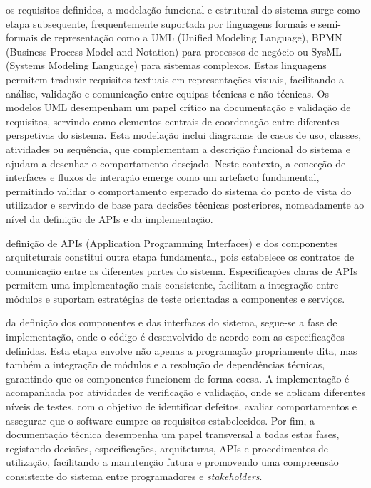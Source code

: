  os requisitos definidos, a modelação funcional e estrutural do sistema surge como etapa subsequente, frequentemente suportada por linguagens formais e semi-formais de representação como a UML (Unified Modeling Language), BPMN (Business Process Model and Notation) para processos de negócio ou SysML (Systems Modeling Language) para sistemas complexos. Estas linguagens permitem traduzir requisitos textuais em representações visuais, facilitando a análise, validação e comunicação entre equipas técnicas e não técnicas. Os modelos UML desempenham um papel crítico na documentação e validação de requisitos, servindo como elementos centrais de coordenação entre diferentes perspetivas do sistema\cite{UML}. Esta modelação inclui diagramas de casos de uso, classes, atividades ou sequência, que complementam a descrição funcional do sistema e ajudam a desenhar o comportamento desejado. Neste contexto, a conceção de interfaces e fluxos de interação emerge como um artefacto fundamental, permitindo validar o comportamento esperado do sistema do ponto de vista do utilizador e servindo de base para decisões técnicas posteriores, nomeadamente ao nível da definição de APIs e da implementação.\par

 definição de APIs (Application Programming Interfaces) e dos componentes arquiteturais constitui outra etapa fundamental, pois estabelece os contratos de comunicação entre as diferentes partes do sistema. Especificações claras de APIs permitem uma implementação mais consistente, facilitam a integração entre módulos e suportam estratégias de teste orientadas a componentes e serviços.

 da definição dos componentes e das interfaces do sistema, segue-se a fase de implementação, onde o código é desenvolvido de acordo com as especificações definidas. Esta etapa envolve não apenas a programação propriamente dita, mas também a integração de módulos e a resolução de dependências técnicas, garantindo que os componentes funcionem de forma coesa. A implementação é acompanhada por atividades de verificação e validação, onde se aplicam diferentes níveis de testes, com o objetivo de identificar defeitos, avaliar comportamentos e assegurar que o software cumpre os requisitos estabelecidos. Por fim, a documentação técnica desempenha um papel transversal a todas estas fases, registando decisões, especificações, arquiteturas, APIs e procedimentos de utilização, facilitando a manutenção futura e promovendo uma compreensão consistente do sistema entre programadores e \textit{stakeholders}.\\\par


